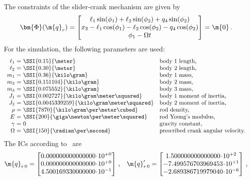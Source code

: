 %
The constraints of the slider-crank mechanism are given by
%
\begin{equation*}
  \bm{\Phi}(\m{q}_{r}) = \begin{bmatrix}
    \ell_1\sin(\phi_1) + \ell_2\sin(\phi_2) + q_4\sin(\phi_2) \\
    x_3 - \ell_1\cos(\phi_1) - \ell_2\cos(\phi_2) - q_4\cos(\phi_2) \\
    \phi_1 - \Omega t \\
  \end{bmatrix} = \m{0} \, \text{.}
\end{equation*}
%
For the simulation, the following parameters are used:
%
\begin{equation*}
  \begin{array}{r@{~}c@{~}ll}
    \ell_1 &=& \SSI{0.15}{\meter}                           & \text{body 1 length,} \\
    \ell_2 &=& \SSI{0.30}{\meter}                           & \text{body 2 length,} \\
    m_1    &=& \SSI{0.36}{\kilo\gram}                       & \text{body 1 mass,} \\
    m_2    &=& \SSI{0.151104}{\kilo\gram}                   & \text{body 2 mass,} \\
    m_3    &=& \SSI{0.075552}{\kilo\gram}                   & \text{body 3 mass,} \\
    J_1    &=& \SSI{0.002727}{\kilo\gram\meter\squared}     & \text{body 1 moment of inertia,} \\
    J_2    &=& \SSI{0.0045339259}{\kilo\gram\meter\squared} & \text{body 2 moment of inertia,} \\
    \rho   &=& \SSI{7870}{\kilo\gram\per\meter\cubed}       & \text{rod density,} \\
    E      &=& \SSI{200}{\giga\newton\per\meter\squared}    & \text{rod Young's modulus,} \\
    \gamma &=& 0                                            & \text{gravity constant,} \\
    \Omega &=& \SSI{150}{\radian\per\second}                & \text{prescribed crank angular velocity.} \\
  \end{array}
\end{equation*}
%
The \acp{IC} according to~\cite{lioen1998test, mazzia2008test} are
%
\begin{equation*}
  \m{q}_{r\,0}^{\phantom{\prime}} = \begin{bmatrix}
    0.000000000000000\!\cdot\!10^{+0} \\
    0.000000000000000\!\cdot\!10^{+0} \\
    4.500169330000000\!\cdot\!10^{-1}
  \end{bmatrix} \, \text{,} \quad
  \m{q}^{\prime}_{r\,0} = \begin{bmatrix}
     1.500000000000000\!\cdot\!10^{+2} \\
    -7.499576703969453\!\cdot\!10^{+1} \\
    -2.689386719979040\!\cdot\!10^{-6}
  \end{bmatrix} \, \text{,}
\end{equation*}
